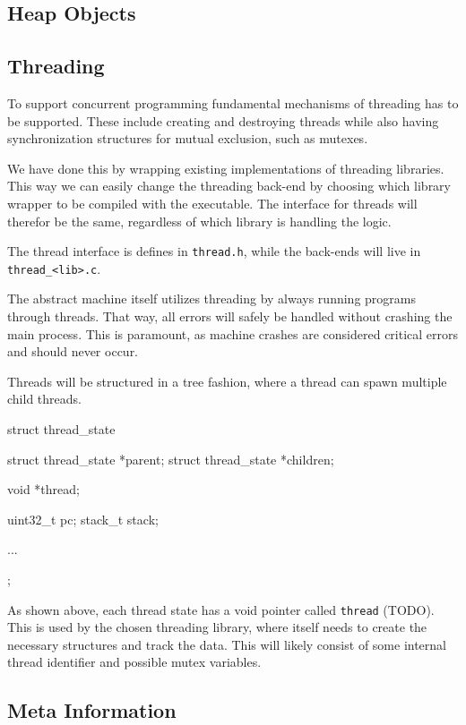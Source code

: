 \subsection{Heap Objects}


\subsection{Threading}

To support concurrent programming fundamental mechanisms of threading has to be
supported. These include creating and destroying threads while also having
synchronization structures for mutual exclusion, such as mutexes.

We have done this by wrapping existing implementations of threading libraries.
This way we can easily change the threading back-end by choosing which library
wrapper to be compiled with the executable. The interface for threads will
therefor be the same, regardless of which library is handling the logic.

The thread interface is defines in {\tt thread.h}, while the back-ends will live
in {\tt thread\_<lib>.c}.

The abstract machine itself utilizes threading by always running programs
through threads. That way, all errors will safely be handled without crashing
the main process. This is paramount, as machine crashes are considered critical
errors and should never occur.

Threads will be structured in a tree fashion, where a thread can spawn multiple
child threads.
\begin{ccode}
struct thread_state {
    struct thread_state *parent;
    struct thread_state *children;

    void *thread;

    uint32_t pc;
    stack_t stack;

    ...
};
\end{ccode}

As shown above, each thread state has a void pointer called {\tt thread}
(TODO). This is used by the chosen threading library, where itself needs to
create the necessary structures and track the data. This will likely consist of
some internal thread identifier and possible mutex variables.

\subsection{Meta Information}


